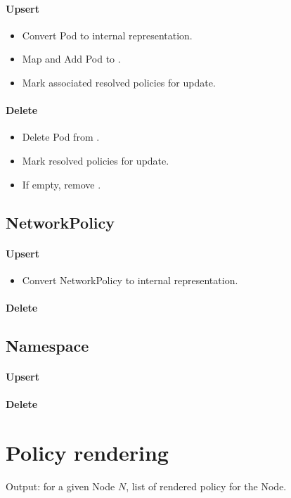 \documentclass[11pt]{article}
\begin{document}
\paragraph{Upsert}

\begin{itemize}
    \item Convert Pod to internal representation.
    \item Map and Add Pod to \podeqc.
    \item Mark associated resolved policies for update.
\end{itemize}

\paragraph{Delete}

\begin{itemize}
    \item Delete Pod from \podeqc.
    \item Mark resolved policies for update.
    \item If empty, remove \podeqc.
\end{itemize}

\subsection{NetworkPolicy}
\paragraph{Upsert}

\begin{itemize}
    \item Convert NetworkPolicy to internal representation.
\end{itemize}

\paragraph{Delete}
\subsection{Namespace}
\paragraph{Upsert}
\paragraph{Delete}

\section{Policy rendering}



Output: for a given Node $N$, list of rendered policy for the Node.
\end{document}
